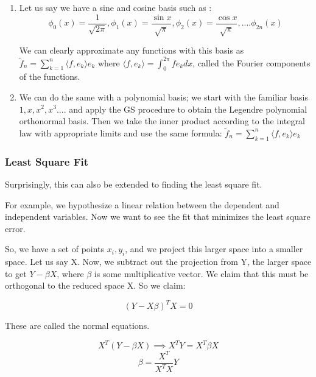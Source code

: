 \begin{enumerate}
    \item Let us say we have a sine and cosine basis such as :
    $$\phi_0(x)=\frac{1}{\sqrt{2\pi}}, \phi_1(x)=\frac{\sin x}{\sqrt{\pi}}, \phi_2(x)=\frac{\cos x}{\sqrt{\pi}}, .... \phi_{2n}(x)$$

    We can clearly approximate any functions with this basis as $\tilde{f}_n  = \sum_{k=1}^n \langle f, e_k \rangle e_k$ where $\langle f, e_k \rangle=\int_0^{2\pi} fe_k dx$, called the Fourier components of the functions. 

    \item We can do the same with a polynomial basis; we start with the familiar basis $1, x, x^2, x^3....$ and apply the GS procedure to obtain the Legendre polynomial orthonormal basis. Then  we take the inner product according to the integral law with appropriate limits and use the same formula: $\tilde{f}_n = \sum_{k=1}^n \langle f, e_k \rangle e_k$
\end{enumerate}

\subsubsection{Least Square Fit}

Surprisingly, this can also be extended to finding the least square fit. 

For example, we hypothesize a linear relation between the dependent and independent variables. Now we want to see the fit that minimizes the least square error.

So, we have a set of points $x_i, y_i$, and we project this larger space into a smaller space. Let us say X. Now, we subtract out the projection from Y, the larger space to get $Y-\beta X$, where $\beta$ is some multiplicative vector. We claim that this must be orthogonal to the reduced space X. 
So we claim:

$$(Y-X\beta)^TX=0$$

These are called the normal equations. 

$$X^T(Y-\beta X) \implies X^TY = X^T\beta X $$
$$\beta = \frac{X^T}{X^TX}Y$$



